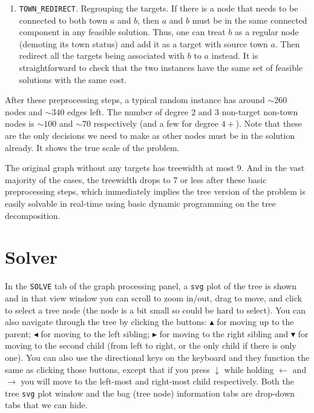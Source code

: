 \documentclass[11pt]{article}
\theoremstyle{definition}
\theoremstyle{remark}
\begin{document}
\begin{enumerate}
\begin{enumerate}
        \item[5.] \texttt{TOWN\_REDIRECT}. Regrouping the targets. If there is a node that needs to be connected to both town $a$ and $b$, then $a$ and $b$ must be in the same connected component in any feasible solution. Thus, one can treat $b$ as a regular node (demoting its town status) and add it as a target with source town $a$. Then redirect all the targets being associated with $b$ to $a$ instead. It is straightforward to check that the two instances have the same set of feasible solutions with the same cost.
    \end{enumerate}
\end{enumerate}

After these preprocessing steps, a typical random instance has around $\sim 260$ nodes and $\sim 340$ edges left. The number of degree 2 and 3 non-target non-town nodes is $\sim 100$ and $\sim 70$ respectively (and a few for degree $4+$). Note that these are the only decisions we need to make as other nodes must be in the solution already. It shows the true scale of the problem.

The original graph without any targets has treewidth at most 9. And in the vast majority of the cases, the treewidth drops to 7 or less after these basic preprocessing steps, which immediately implies the tree version of the problem is easily solvable in real-time using basic dynamic programming on the tree decomposition. 



\section{Solver}
\label{solve}

In the \texttt{SOLVE} tab of the graph processing panel, a \texttt{svg} plot of the tree is shown and in that view window you can scroll to zoom in/out, drag to move, and click to select a tree node (the node is a bit small so could be hard to select). You can also navigate through the tree by clicking the buttons: $\blacktriangle$ for moving up to the parent; $\blacktriangleleft$ for moving to the left sibling; $\blacktriangleright$ for moving to the right sibling and $\blacktriangledown$ for moving to the second child (from left to right, or the only child if there is only one). You can also use the directional keys on the keyboard and they function the same as clicking those buttons, except that if you press $\downarrow$ while holding $\leftarrow$ and $\rightarrow$ you will move to the left-most and right-most child respectively. Both the tree \texttt{svg} plot window and the bag (tree node) information tabs are drop-down tabs that we can hide.
\end{document}
